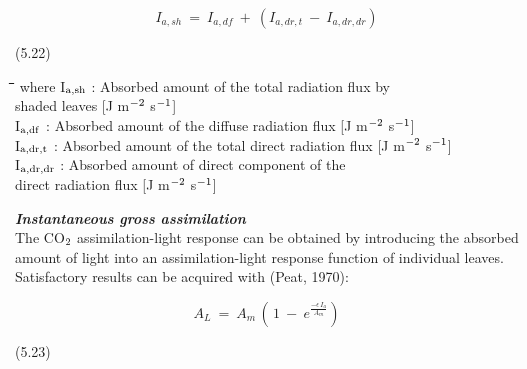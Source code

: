 \begin{displaymath}
I _{a,sh} ~=~ I _{a,df} ~+~ (I _{a,dr,t} ~-~ I _{a,dr,dr} )
\end{displaymath}

 
\strut\hfill (5.22)
\nwln
\begin{tabbing}
\hspace{1.27cm}\=\hspace{1.27cm}\=\hspace{1.27cm}\=\hspace{1.27cm}\=%
\hspace{1.27cm}\=\hspace{1.27cm}\=\hspace{1.27cm}\=\hspace{1.27cm}\=%
\hspace{1.27cm}\=\hspace{1.27cm}\=\kill
where I$_{{\rm a,sh}}$ : Absorbed amount of the total radiation flux by \\
   shaded leaves        [J m$^{{\rm -2}}$ s$^{{\rm -1}}$]\\
I$_{{\rm a,df}}$ : Absorbed amount of the diffuse radiation flux        [J m$^{{\rm -2}}$ s$^{{\rm -1}}$]\\
I$_{{\rm a,dr,t}}$ : Absorbed amount of the total direct radiation flux        [J m$^{{\rm -2}}$ s$^{{\rm -1}}$]\\
I$_{{\rm a,dr,dr}}$ : Absorbed amount of direct component of the \\
   direct radiation flux          [J m$^{{\rm -2}}$ s$^{{\rm -1}}$]
\end{tabbing}


{\bf {\it Instantaneous gross assimilation\/}}\\
The CO$_{{\rm 2}}$ assimilation-light response can be obtained by introducing the absorbed amount
of light into an assimilation-light response function of individual leaves. Satisfactory
results can be acquired with (Peat, 1970):

\begin{displaymath}
A _{L} ~=~ A _{m} \, (\, 1~-~ e ^{{\frac{ - \epsilon\, I _{a} }{ A _{m} }} } )
\end{displaymath}

 
\strut\hfill (5.23)

